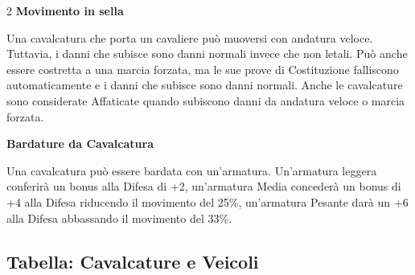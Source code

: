 \begin{multicols}{2}
\textbf{Movimento in sella}\label{movimentoacavallo}

Una cavalcatura che porta un cavaliere può muoversi con andatura veloce. Tuttavia, i danni che subisce sono danni normali invece che non letali. Può anche essere costretta a una marcia forzata, ma le sue prove di Costituzione falliscono automaticamente e i danni che subisce sono danni normali. Anche le cavalcature sono considerate Affaticate quando subiscono danni da andatura veloce o marcia forzata.

\textbf{Bardature da Cavalcatura}\label{ArmaturedaCavallo}\hypertarget{ArmaturedaCavallo}{}

Una cavalcatura può essere bardata con un'armatura. Un'armatura leggera conferirà un bonus alla Difesa di +2, un'armatura Media concederà un bonus di +4 alla Difesa riducendo il movimento del 25\%, un'armatura Pesante darà un +6 alla Difesa abbassando il movimento del 33\%.

\end{multicols}


\subsection{Tabella: Cavalcature e Veicoli}\label{TabellaCavalcatureeVeicoli}\hypertarget{TabellaCavalcatureeVeicoli}{}

\medskip

\label{tabella-cavalcature-e-veicoli}\hypertarget{tabella-cavalcature-e-veicoli}{}

